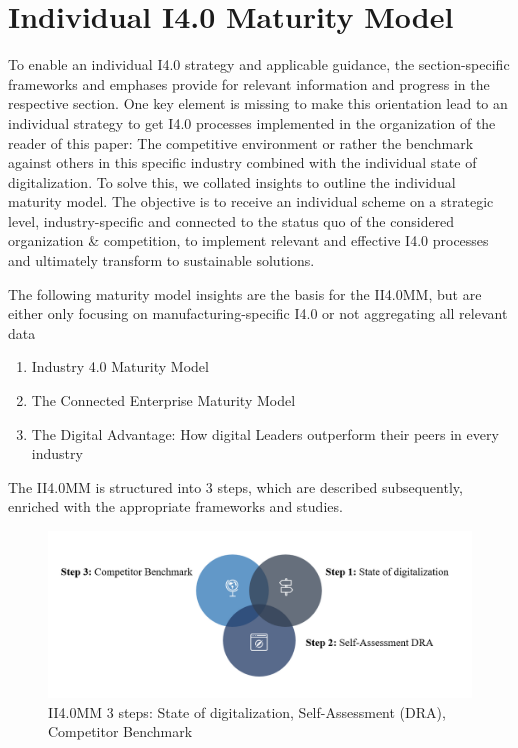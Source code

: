 \section{Individual I4.0 Maturity Model}

To enable an individual \ac{I4.0} strategy and applicable guidance, the section-specific frameworks and emphases provide for relevant information and progress in the respective section. One key element is missing to make this orientation lead to an individual strategy to get \ac{I4.0} processes implemented in the organization of the reader of this paper: The competitive environment or rather the benchmark against others in this specific industry combined with the individual state of digitalization. To solve this, we collated insights to outline the individual maturity model. The objective is to receive an individual scheme on a strategic level, industry-specific and connected to the status quo of the considered organization \& competition, to implement relevant and effective \ac{I4.0} processes and ultimately transform to sustainable solutions.

The following maturity model insights are the basis for the \ac{II4.0MM}, but are either only focusing on manufacturing-specific \ac{I4.0} or not aggregating all relevant data

\begin{enumerate}
\item Industry 4.0 Maturity Model \cite{Schumacher2016161}
\item The Connected Enterprise Maturity Model \cite{RockWellAutomation-connectedEnterpriseMaturityModel}
\item The Digital Advantage: How digital Leaders outperform their peers in every industry \cite{CapgeminiMaturityModelDigitalAdvantage}
\end{enumerate}

The \ac{II4.0MM} is structured into 3 steps, which are described subsequently, enriched with the appropriate frameworks and studies.


\begin{figure}[H]
\centering
\includegraphics[width=1\columnwidth]{images/II40MM_grafik.PNG}
\caption{\ac{II4.0MM} 3 steps: State of digitalization, Self-Assessment (DRA), Competitor Benchmark}
\end{figure}

